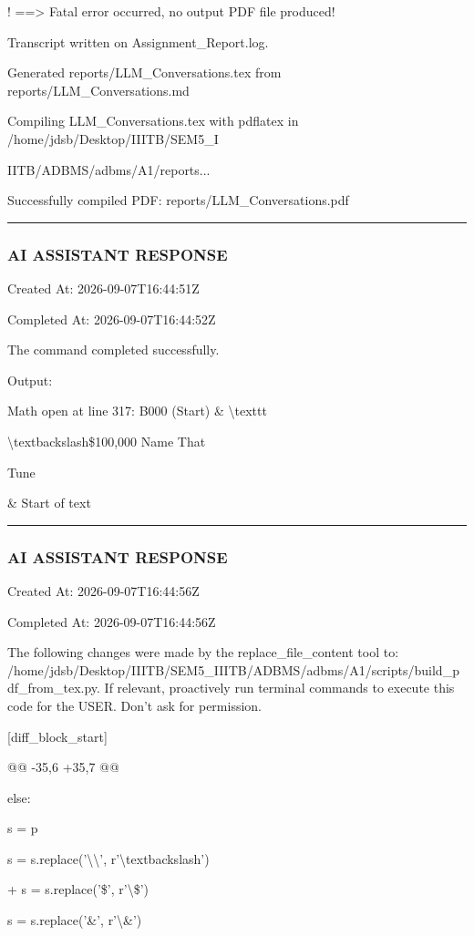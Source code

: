 \documentclass[11pt,a4paper]{article}
\begin{document}
!  ==> Fatal error occurred, no output PDF file produced!

Transcript written on Assignment\_Report.log.

Generated reports/LLM\_Conversations.tex from reports/LLM\_Conversations.md

Compiling LLM\_Conversations.tex with pdflatex in /home/jdsb/Desktop/IIITB/SEM5\_I

IITB/ADBMS/adbms/A1/reports...

Successfully compiled PDF: reports/LLM\_Conversations.pdf


\hrule

\subsubsection{AI ASSISTANT RESPONSE}

Created At: 2026-09-07T16:44:51Z

Completed At: 2026-09-07T16:44:52Z


The command completed successfully.

Output:

Math open at line 317: B000 (Start) \& \textbackslash{}texttt{\textbackslash{}textbackslash{}\$100,000 Name That

Tune} \& Start of text


\hrule

\subsubsection{AI ASSISTANT RESPONSE}

Created At: 2026-09-07T16:44:56Z

Completed At: 2026-09-07T16:44:56Z

The following changes were made by the replace\_file\_content tool to: /home/jdsb/Desktop/IIITB/SEM5\_IIITB/ADBMS/adbms/A1/scripts/build\_pdf\_from\_tex.py. If relevant, proactively run terminal commands to execute this code for the USER. Don't ask for permission.

[diff\_block\_start]

@@ -35,6 +35,7 @@

else:

s = p

s = s.replace('\textbackslash{}\textbackslash{}', r'\textbackslash{}textbackslash{}')

+            s = s.replace('\$', r'\textbackslash{}\$')

s = s.replace('\&', r'\textbackslash{}\&')
\end{document}
